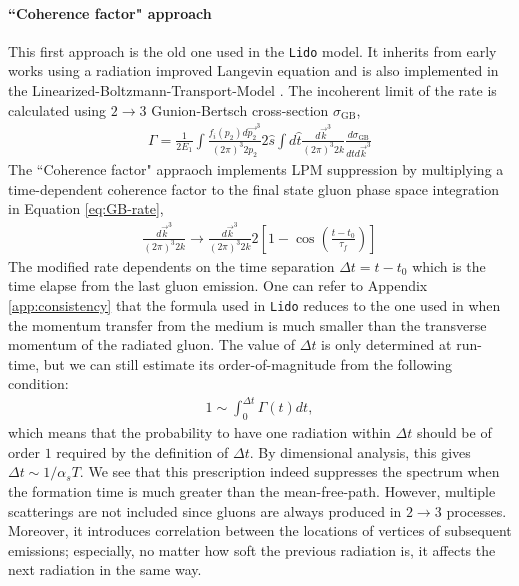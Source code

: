 \documentclass[aps, prc, reprint, amsmath, groupedaddress, nofootinbib]{revtex4-1}
\begin{document}
\paragraph*{``Coherence factor" approach} This first approach is the old one used in the {\tt Lido} model. 
It inherits from early works using a radiation improved Langevin equation \cite{Cao:2013ita} and is also implemented in the Linearized-Boltzmann-Transport-Model \cite{Cao:2016gvr,Cao:2017hhk}. 
The incoherent limit of the rate is calculated using $2\rightarrow 3$ Gunion-Bertsch cross-section $\sigma_\textrm{GB}$,
\begin{eqnarray}\label{eq:GB-rate}
\Gamma = \frac{1}{2E_1}\int\frac{f_i(p_2)d\vec{p_2}^3}{(2\pi)^3 2p_2}2\hat{s}\int d\hat{t}\frac{d\vec{k}^3}{(2\pi)^3 2k}\frac{d\sigma_{\textrm{GB}}}{d\hat{t}d\vec{k}^3}
\end{eqnarray}
The ``Coherence factor" appraoch implements LPM suppression by multiplying a time-dependent coherence factor to the final state gluon phase space integration in Equation \ref{eq:GB-rate},
\begin{eqnarray}\label{eq:GB-rate-LPM}
\frac{d\vec{k}^3}{(2\pi)^3 2k} \rightarrow \frac{d\vec{k}^3}{(2\pi)^3 2k} 2\left[1-\cos\left(\frac{t-t_0}{\tau_f}\right)\right]
\end{eqnarray}
The modified rate dependents on the time separation $\Delta t = t-t_0$ which is the time elapse from the last gluon emission.
One can refer to Appendix \ref{app:consistency} that the formula used in {\tt Lido} reduces to the one used in \cite{Cao:2013ita} when the momentum transfer from the medium is much smaller than the transverse momentum of the radiated gluon.
The value of $\Delta t$ is only determined at run-time,
but we can still estimate its order-of-magnitude from the following condition:
\begin{eqnarray}
1 \sim \int_0^{\Delta t}\Gamma(t) dt,
\end{eqnarray}
which means that the probability to have one radiation within $\Delta t$ should be of order $1$ required by the definition of $\Delta t$.
By dimensional analysis, this gives $\Delta t \sim 1/\alpha_s T$.
We see that this prescription indeed suppresses the spectrum when the formation time is much greater than the mean-free-path. 
However, multiple scatterings are not included since gluons are always produced in $2\rightarrow3$ processes.
Moreover, it introduces correlation between the locations of vertices of subsequent emissions;
especially, no matter how soft the previous radiation is, it affects the next radiation in the same way.
\end{document}
